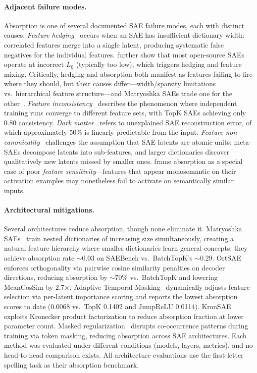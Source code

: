 \documentclass{article}
\begin{document}
\paragraph{Adjacent failure modes.} Absorption is one of several documented SAE failure modes, each with distinct causes. \emph{Feature hedging}~\citep{chanin2025hedging} occurs when an SAE has insufficient dictionary width: correlated features merge into a single latent, producing systematic false negatives for the individual features. \citet{chanin2025sparse} further show that most open-source SAEs operate at incorrect $L_0$ (typically too low), which triggers hedging and feature mixing. Critically, hedging and absorption both manifest as features failing to fire where they should, but their causes differ---width/sparsity limitations vs.\ hierarchical feature structure---and Matryoshka SAEs trade one for the other~\citep{chanin2025hedging}. \emph{Feature inconsistency}~\citep{song2025inconsistency} describes the phenomenon where independent training runs converge to different feature sets, with TopK SAEs achieving only 0.80 consistency. \emph{Dark matter}~\citep{engels2024dark} refers to unexplained SAE reconstruction error, of which approximately 50\% is linearly predictable from the input. \emph{Feature non-canonicality}~\citep{leask2025noncanonical} challenges the assumption that SAE latents are atomic units: meta-SAEs decompose latents into sub-features, and larger dictionaries discover qualitatively new latents missed by smaller ones. \citet{tian2025sensitivity} frame absorption as a special case of poor \emph{feature sensitivity}---features that appear monosemantic on their activation examples may nonetheless fail to activate on semantically similar inputs.

\paragraph{Architectural mitigations.} Several architectures reduce absorption, though none eliminate it. Matryoshka SAEs~\citep{bussmann2025matryoshka} train nested dictionaries of increasing size simultaneously, creating a natural feature hierarchy where smaller dictionaries learn general concepts; they achieve absorption rate ${\sim}$0.03 on SAEBench vs.\ BatchTopK's ${\sim}$0.29. OrtSAE~\citep{korznikov2025ortsae} enforces orthogonality via pairwise cosine similarity penalties on decoder directions, reducing absorption by ${\sim}$70\% vs.\ BatchTopK and lowering MeanCosSim by 2.7$\times$. Adaptive Temporal Masking~\citep{li2025atm} dynamically adjusts feature selection via per-latent importance scoring and reports the lowest absorption scores to date (0.0068 vs.\ TopK 0.1402 and JumpReLU 0.0114). KronSAE~\citep{kronsae2025} exploits Kronecker product factorization to reduce absorption fraction at lower parameter count. Masked regularization~\citep{narayanaswamy2026masked} disrupts co-occurrence patterns during training via token masking, reducing absorption across SAE architectures. Each method was evaluated under different conditions (models, layers, metrics), and no head-to-head comparison exists. All architecture evaluations use the first-letter spelling task as their absorption benchmark.
\end{document}
